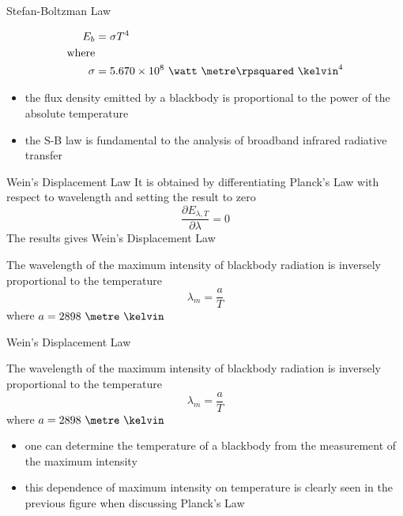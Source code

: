 \begin{frame}{Stefan-Boltzman Law}
\begin{fancydefs}
	\begin{align*}
	E_b &= \sigma T^4\\
	\text{where}\\
	\sigma &= 5.670 \times 10^8\ \watt\ \metre\rpsquared\ \kelvin^4
	\end{align*}
\end{fancydefs}
\begin{itemize}
	\item the flux density emitted by a blackbody is proportional to the  power of the absolute temperature
	\item the S-B law is fundamental to the analysis of broadband infrared radiative transfer
\end{itemize}
\end{frame}

\begin{frame}{Wein's Displacement Law}
It is obtained by differentiating Planck's Law with respect to wavelength and setting the result to zero
	$$\frac{\partial E_{\lambda,T}}{\partial \lambda} = 0$$
	The results gives Wein's Displacement Law
\begin{fancydefs}
	The wavelength of the maximum intensity of blackbody radiation is inversely proportional to the temperature
	$$\lambda_m = \frac{a}{T}$$
	where $a = 2898\ \metre\ \kelvin$
	\end{fancydefs}
\end{frame}

\begin{frame}{Wein's Displacement Law}
\begin{fancydefs}
	The wavelength of the maximum intensity of blackbody radiation is inversely proportional to the temperature
	$$\lambda_m = \frac{a}{T}$$
	where $a = 2898\ \metre\ \kelvin$
	\end{fancydefs}
\begin{itemize}
	\item one can determine the temperature of a blackbody from the measurement of the maximum intensity
	\item this dependence of maximum intensity on temperature is clearly seen in the previous figure when discussing Planck's Law
\end{itemize}
\end{frame}

